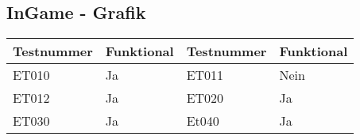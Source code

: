 \subsection{InGame - Grafik}

\begin{tabularx}{0.9\textwidth}{p{}|p{}||p{}|p{}}
    \textbf{Testnummer} & \textbf{Funktional} & \textbf{Testnummer} & \textbf{Funktional}\\
    \hline
    ET010	& Ja& ET011	& Nein	\\
    \hline              
    ET012   & Ja   & ET020   & Ja  \\      
    \hline            
    ET030   &Ja & Et040   &Ja \\
\end{tabularx}